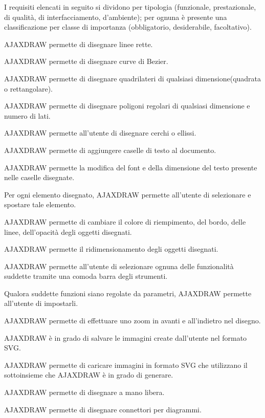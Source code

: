 \label{listarequisiti}
I requisiti elencati in seguito si dividono per tipologia (funzionale, prestazionale, di qualit\`a, di interfacciamento, d'ambiente); 
per ognuna \`e presente una classificazione per classe di importanza (obbligatorio, desiderabile, facoltativo). 
\begin{elenconumerato}{\subsubsecindent}
\item{AJAXDRAW permette di disegnare linee rette.}
\item{AJAXDRAW permette di disegnare curve di Bezier.}
\item{AJAXDRAW permette di disegnare quadrilateri di qualsiasi dimensione(quadrata o rettangolare).}
\item{AJAXDRAW permette di disegnare poligoni regolari di qualsiasi dimensione e numero di lati.}
\item{AJAXDRAW permette all'utente di disegnare cerchi o ellissi.}
\item{AJAXDRAW permette di aggiungere caselle di testo al documento. }
\item{AJAXDRAW permette la modifica del font e della dimensione del testo presente nelle caselle disegnate.}
\item{Per ogni elemento disegnato, AJAXDRAW permette all'utente di selezionare e spostare tale elemento.}
\item{AJAXDRAW permette di cambiare il colore di riempimento, del bordo, delle linee, dell'opacità degli oggetti disegnati.}
\item{AJAXDRAW permette il ridimensionamento degli oggetti disegnati.}
\item{AJAXDRAW permette all'utente di selezionare ognuna delle funzionalit\`a suddette tramite una comoda barra degli strumenti.}
\item{Qualora suddette funzioni siano regolate da parametri, AJAXDRAW permette all'utente di impostarli.}
\item{AJAXDRAW permette di effettuare uno zoom in avanti e all'indietro nel disegno.}
\item{AJAXDRAW \`e in grado di salvare le immagini create dall'utente nel formato SVG.}
\item{AJAXDRAW permette di caricare immagini in formato SVG che utilizzano il sottoinsieme che AJAXDRAW \`e in grado di generare.}
\end{elenconumerato}

\begin{elenconumerato}{\subsubsecindent}
\item{AJAXDRAW permette di disegnare a mano libera.}
\item{AJAXDRAW permette di disegnare connettori per diagrammi.}
\end{elenconumerato}

